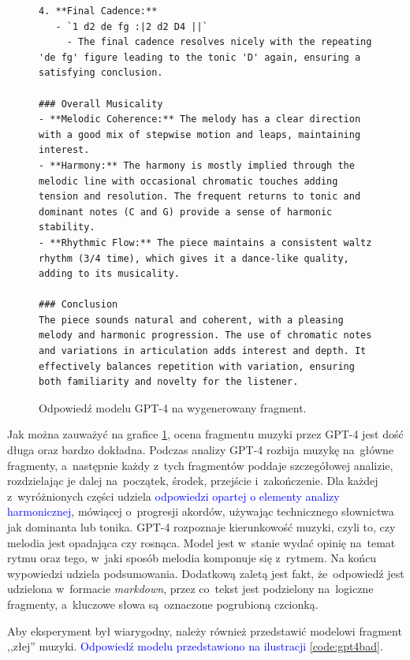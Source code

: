 \documentclass[data-science]{agh-wi} %
\begin{document}
\begin{figure}[ht!]
\begin{verbatim}
4. **Final Cadence:**
   - `1 d2 de fg :|2 d2 D4 ||`
     - The final cadence resolves nicely with the repeating 'de fg' figure leading to the tonic 'D' again, ensuring a satisfying conclusion.

### Overall Musicality
- **Melodic Coherence:** The melody has a clear direction with a good mix of stepwise motion and leaps, maintaining interest.
- **Harmony:** The harmony is mostly implied through the melodic line with occasional chromatic touches adding tension and resolution. The frequent returns to tonic and dominant notes (C and G) provide a sense of harmonic stability.
- **Rhythmic Flow:** The piece maintains a consistent waltz rhythm (3/4 time), which gives it a dance-like quality, adding to its musicality.

### Conclusion
The piece sounds natural and coherent, with a pleasing melody and harmonic progression. The use of chromatic notes and variations in articulation adds interest and depth. It effectively balances repetition with variation, ensuring both familiarity and novelty for the listener.
\end{verbatim}
    \caption{Odpowiedź modelu GPT-4 na wygenerowany fragment.}\label{code:gpt4good}
\end{figure}

Jak można zauważyć na grafice \ref*{code:gpt4good}, ocena fragmentu muzyki przez GPT-4 jest dość długa oraz bardzo dokładna. Podczas analizy GPT-4 rozbija muzykę na~główne fragmenty, a~następnie każdy z~tych fragmentów poddaje szczegółowej analizie, rozdzielając je dalej na~początek, środek, przejście i~zakończenie. Dla każdej z~wyróżnionych części udziela \textcolor{blue}{odpowiedzi opartej o elementy analizy harmonicznej}, mówiącej o~progresji akordów, używając technicznego słownictwa jak dominanta lub tonika. GPT-4 rozpoznaje kierunkowość muzyki, czyli to, czy melodia jest opadająca czy rosnąca. Model jest w~stanie wydać opinię na~temat rytmu oraz tego, w~jaki sposób melodia komponuje się z~rytmem. Na końcu wypowiedzi udziela podsumowania. Dodatkową zaletą jest fakt, że~odpowiedź jest udzielona w~formacie \textit{markdown}, przez co~tekst jest podzielony na~logiczne fragmenty, a~kluczowe słowa są~oznaczone pogrubioną czcionką.

Aby eksperyment był wiarygodny, należy również przedstawić modelowi fragment ,,złej'' muzyki. \textcolor{blue}{Odpowiedź modelu przedstawiono na ilustracji \ref*{code:gpt4bad}}.
\end{document}
